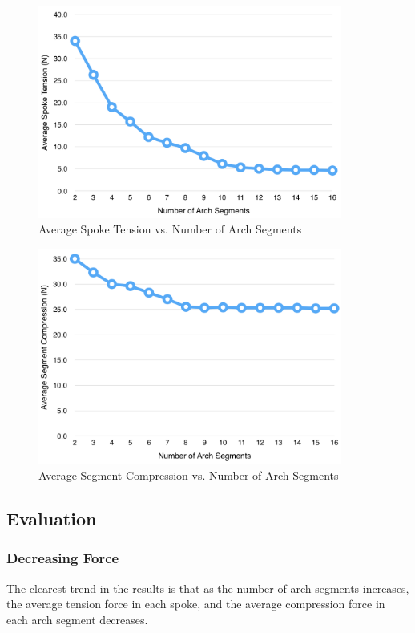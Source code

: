 \documentclass[a4paper,11pt]{article}
\begin{document}
\begin{figure}
\begin{center}
\includegraphics[width=10cm]{figures/spokes.png}
\end{center}
\caption{Average Spoke Tension vs. Number of Arch Segments}
\end{figure}


\begin{figure}
\begin{center}
\includegraphics[width=10cm]{figures/segments.png}
\end{center}
\caption{Average Segment Compression vs. Number of Arch Segments}
\end{figure}


\subsection{Evaluation}

\subsubsection{Decreasing Force}

The clearest trend in the results is that as the number of arch segments
increases, the average tension force in each spoke, and the average compression
force in each arch segment decreases.
\end{document}
